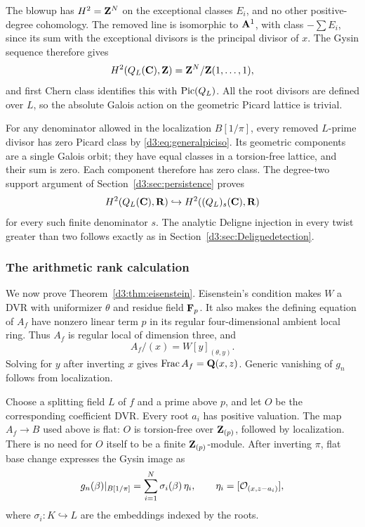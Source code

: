 The blowup has $H^2=\mathbf Z^N$ on the exceptional classes $E_i$, and no other positive-degree cohomology. The removed line is isomorphic to $\mathbf A^1$, with class $-\sum E_i$, since its sum with the exceptional divisors is the principal divisor of $x$. The Gysin sequence therefore gives
\[
H^2(Q_L(\mathbf C),\mathbf Z)=\mathbf Z^N/\mathbf Z(1,\ldots,1),
\]
and first Chern class identifies this with $\operatorname{Pic}(Q_L)$. All the root divisors are defined over $L$, so the absolute Galois action on the geometric Picard lattice is trivial.

For any denominator allowed in the localization $B[1/\pi]$, every removed $L$-prime divisor has zero Picard class by \eqref{d3:eq:generalpiciso}. Its geometric components are a single Galois orbit; they have equal classes in a torsion-free lattice, and their sum is zero. Each component therefore has zero class. The degree-two support argument of Section~\ref{d3:sec:persistence} proves
\[
H^2(Q_L(\mathbf C),\mathbf R)\hookrightarrow H^2((Q_L)_s(\mathbf C),\mathbf R)
\]
for every such finite denominator $s$. The analytic Deligne injection in every twist greater than two follows exactly as in Section~\ref{d3:sec:Delignedetection}.

\subsubsection{The arithmetic rank calculation}

We now prove Theorem~\ref{d3:thm:eisenstein}. Eisenstein's condition makes $W$ a DVR with uniformizer $\theta$ and residue field $\mathbf F_p$. It also makes the defining equation of $A_f$ have nonzero linear term $p$ in its regular four-dimensional ambient local ring. Thus $A_f$ is regular local of dimension three, and
\[
A_f/(x)=W[y]_{(\theta,y)}.
\]
Solving for $y$ after inverting $x$ gives $\operatorname{Frac} A_f=\mathbf Q(x,z)$. Generic vanishing of $g_n$ follows from localization.

Choose a splitting field $L$ of $f$ and a prime above $p$, and let $O$ be the corresponding coefficient DVR. Every root $a_i$ has positive valuation. The map $A_f\to B$ used above is flat: $O$ is torsion-free over $\mathbf Z_{(p)}$, followed by localization. There is no need for $O$ itself to be a finite $\mathbf Z_{(p)}$-module. After inverting $\pi$, flat base change expresses the Gysin image as
\begin{equation}\label{d3:eq:generalbasechange}
g_n(\beta)|_{B[1/\pi]}=
\sum_{i=1}^N \sigma_i(\beta)\,\eta_i,
\qquad \eta_i=[\mathcal O_{(x,z-a_i)}],
\end{equation}
where $\sigma_i:K\hookrightarrow L$ are the embeddings indexed by the roots.

